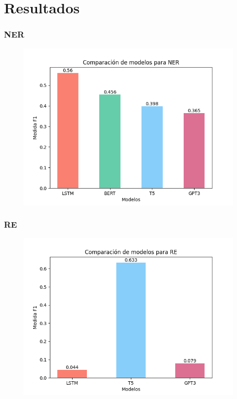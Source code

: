 \documentclass[
11pt, %
%
aspectratio=169, %
]{beamer}
\begin{document}
	\section{Resultados}
	\begin{frame}
		\frametitle{NER}
		
				\begin{figure}[h!]
					\centering
					\includegraphics[scale=0.5]{../images/NER_bar}
				\end{figure} 	
		
	
		
	\end{frame}
	
	\begin{frame}
		\frametitle{RE}
			\begin{figure}[h!]
			\centering
			\includegraphics[scale=0.5]{../images/RE_bar}
		\end{figure} 	
		
		
	\end{frame}
	
\end{document}
